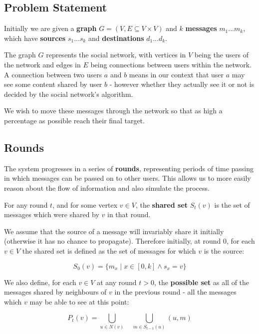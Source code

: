 \documentclass[bsc,frontabs,twoside,singlespacing,parskip,deptreport]{infthesis}     %
\begin{document}
\subsection{Problem Statement}
Initially we are given a \textbf{graph} $G = (V, E \subseteq V \times V)$ and $k$ \textbf{messages} $ m_{1} ... m_{k}$, which have \textbf{sources} $s_{1} ... s_{k}$ and \textbf{destinations} $d_{1} ... d_{k}$. 

The graph $G$ represents the social network, with vertices in $V$ being the users of the network and edges in $E$ being connections between users within the network. A connection between two users $a$ and $b$ means in our context that user $a$ may see some content shared by user $b$ - however whether they actually see it or not is decided by the social network's algorithm.

We wish to move these messages through the network so that as high a percentage as possible reach their final target.

\subsection{Rounds}
The system progresses in a series of \textbf{rounds}, representing periods of time passing in which messages can be passed on to other users. This allows us to more easily reason about the flow of information and also simulate the process.

For any round $t$, and for some vertex $v \in V$, the \textbf{shared set} $S_{t}(v)$ is the set of messages which were shared by $v$ in that round.

We assume that the source of a message will invariably share it initially (otherwise it has no chance to propagate). Therefore initially, at round 0, for each $v \in V$ the shared set is defined as the set of messages for which $v$ is the source:

\begin{equation}
S_{0}(v) = \{m_{x} \; | \; x \in [0, k] \wedge s_{x} = v\}
\end{equation}


We also define, for each $v \in V$ at any round $t > 0$, the \textbf{possible set} as all of the messages shared by neighbours of $v$ in the previous round - all the messages which $v$ may be able to see at this point:

\begin{equation}
P_{t}(v) = \bigcup_{u \in N(v)} \quad \bigcup_{m \in S_{t-1}(u)} (u, m)
\end{equation}
\end{document}
